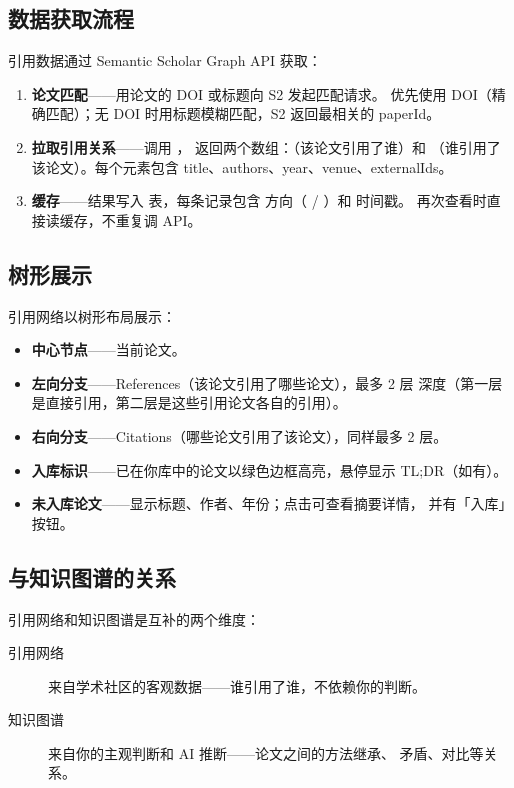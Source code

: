 \subsection{数据获取流程}

引用数据通过 Semantic Scholar Graph API 获取：

\begin{enumerate}
  \item \textbf{论文匹配}——用论文的 DOI 或标题向 S2 发起匹配请求。
    优先使用 DOI（精确匹配）；无 DOI 时用标题模糊匹配，S2 返回最相关的
    paperId。
  \item \textbf{拉取引用关系}——调用 ，
    返回两个数组：（该论文引用了谁）和 （谁引用了
    该论文）。每个元素包含 title、authors、year、venue、externalIds。
  \item \textbf{缓存}——结果写入  表，每条记录包含
    方向（ / ）和  时间戳。
    再次查看时直接读缓存，不重复调 API。
\end{enumerate}

\subsection{树形展示}

引用网络以树形布局展示：

\begin{itemize}
  \item \textbf{中心节点}——当前论文。
  \item \textbf{左向分支}——References（该论文引用了哪些论文），最多 2 层
    深度（第一层是直接引用，第二层是这些引用论文各自的引用）。
  \item \textbf{右向分支}——Citations（哪些论文引用了该论文），同样最多 2 层。
  \item \textbf{入库标识}——已在你库中的论文以绿色边框高亮，悬停显示
    TL;DR（如有）。
  \item \textbf{未入库论文}——显示标题、作者、年份；点击可查看摘要详情，
    并有「入库」按钮。
\end{itemize}

\subsection{与知识图谱的关系}

引用网络和知识图谱是互补的两个维度：

\begin{description}
  \item[引用网络] 来自学术社区的客观数据——谁引用了谁，不依赖你的判断。
  \item[知识图谱] 来自你的主观判断和 AI 推断——论文之间的方法继承、
    矛盾、对比等关系。
\end{description}

